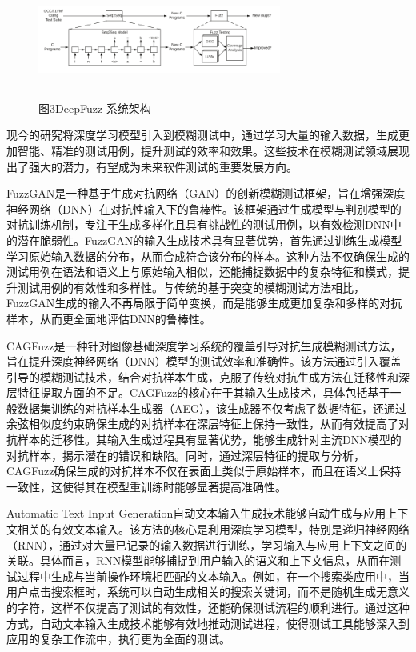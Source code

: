 \documentclass[10.5pt,compsoc]{CjC}
\theoremstyle{mystyle}
\begin{document}
\begin{figure}[htbp]
  \centerline{\includegraphics[width=3.15in,height=1.2in]{./image/DeepFuzz.png}}
  \begin{center}
    图3\quad  DeepFuzz 系统架构\cite{DeepFuzz}
  \end{center}
  \label{fig1}
\end{figure}

现今的研究将深度学习模型引入到模糊测试中，通过学习大量的输入数据，生成更加智能、精准的测试用例，提升测试的效率和效果。这些技术在模糊测试领域展现出了强大的潜力，有望成为未来软件测试的重要发展方向。

FuzzGAN是一种基于生成对抗网络（GAN）的创新模糊测试框架\cite{FuzzGAN}，旨在增强深度神经网络（DNN）在对抗性输入下的鲁棒性。该框架通过生成模型与判别模型的对抗训练机制，专注于生成多样化且具有挑战性的测试用例，以有效检测DNN中的潜在脆弱性。FuzzGAN的输入生成技术具有显著优势，首先通过训练生成模型学习原始输入数据的分布，从而合成符合该分布的样本。这种方法不仅确保生成的测试用例在语法和语义上与原始输入相似，还能捕捉数据中的复杂特征和模式，提升测试用例的有效性和多样性。与传统的基于突变的模糊测试方法相比，FuzzGAN生成的输入不再局限于简单变换，而是能够生成更加复杂和多样的对抗样本，从而更全面地评估DNN的鲁棒性。

CAGFuzz是一种针对图像基础深度学习系统的覆盖引导对抗生成模糊测试方法\cite{CAGFuzz}，旨在提升深度神经网络（DNN）模型的测试效率和准确性。该方法通过引入覆盖引导的模糊测试技术，结合对抗样本生成，克服了传统对抗生成方法在迁移性和深层特征提取方面的不足。CAGFuzz的核心在于其输入生成技术，具体包括基于一般数据集训练的对抗样本生成器（AEG），该生成器不仅考虑了数据特征，还通过余弦相似度约束确保生成的对抗样本在深层特征上保持一致性，从而有效提高了对抗样本的迁移性。其输入生成过程具有显著优势，能够生成针对主流DNN模型的对抗样本，揭示潜在的错误和缺陷。同时，通过深层特征的提取与分析，CAGFuzz确保生成的对抗样本不仅在表面上类似于原始样本，而且在语义上保持一致性，这使得其在模型重训练时能够显著提高准确性。

Automatic Text Input Generation自动文本输入生成技术能够自动生成与应用上下文相关的有效文本输入\cite{atigmt}。该方法的核心是利用深度学习模型，特别是递归神经网络（RNN），通过对大量已记录的输入数据进行训练，学习输入与应用上下文之间的关联。具体而言，RNN模型能够捕捉到用户输入的语义和上下文信息，从而在测试过程中生成与当前操作环境相匹配的文本输入。例如，在一个搜索类应用中，当用户点击搜索框时，系统可以自动生成相关的搜索关键词，而不是随机生成无意义的字符，这样不仅提高了测试的有效性，还能确保测试流程的顺利进行。通过这种方式，自动文本输入生成技术能够有效地推动测试进程，使得测试工具能够深入到应用的复杂工作流中，执行更为全面的测试。
\end{document}
